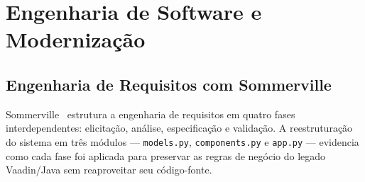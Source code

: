 \chapter{Engenharia de Software e Modernização}

\section{Engenharia de Requisitos com Sommerville}

Sommerville~\cite{sommerville2011} estrutura a engenharia de requisitos em quatro fases
interdependentes: elicitação, análise, especificação e validação. A reestruturação do
sistema em três módulos — \texttt{models.py}, \texttt{components.py} e \texttt{app.py}
— evidencia como cada fase foi aplicada para preservar as regras de negócio do legado
Vaadin/Java sem reaproveitar seu código-fonte.

